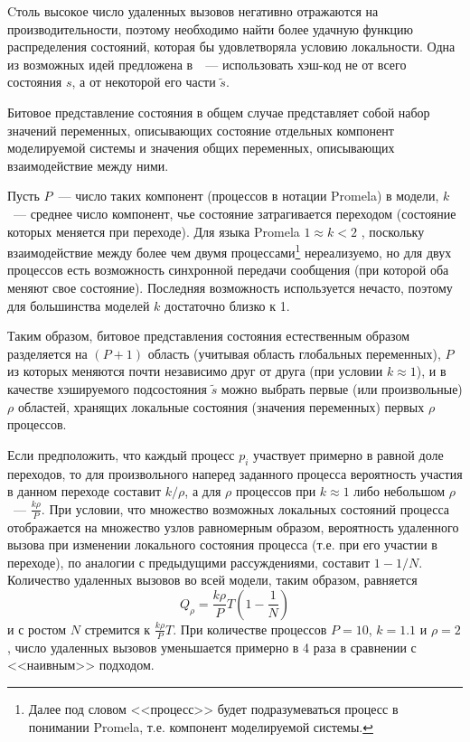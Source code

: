\documentclass[12pt,a4paper,fleqn]{article}
\begin{document}
Cтоль высокое число удаленных вызовов негативно отражаются на производительности, поэтому необходимо найти более удачную
функцию распределения состояний, которая бы удовлетворяла условию локальности. Одна из возможных идей предложена
в~\cite{LS99}~--- использовать хэш-код не от всего состояния $s$, а от некоторой его части $\tilde{s}$.

Битовое представление состояния в общем случае представляет собой набор значений переменных, описывающих состояние
отдельных компонент моделируемой системы и значения общих переменных, описывающих взаимодействие между ними.

Пусть $P$~--- число таких компонент (процессов в нотации Promela) в модели, $k$~--- среднее число компонент, чье
состояние затрагивается переходом (состояние которых меняется при переходе). Для языка Promela $1 \approx k < 2$ ,
поскольку взаимодействие между более чем двумя процессами\footnote{Далее под словом <<процесс>> будет подразумеваться
  процесс в понимании Promela, т.е. компонент моделируемой системы.} нереализуемо, но для двух процессов есть
возможность синхронной передачи сообщения (при которой оба меняют свое состояние). Последняя возможность используется
нечасто, поэтому для большинства моделей $k$ достаточно близко к 1.

Таким образом, битовое представления состояния естественным образом разделяется на $(P+1)$ область (учитывая область
глобальных переменных), $P$ из которых меняются почти независимо друг от друга (при условии $k \approx 1$), и в качестве
хэшируемого подсостояния $\tilde{s}$ можно выбрать первые (или произвольные) $\rho$ областей, хранящих локальные
состояния (значения переменных) первых $\rho$ процессов.

Если предположить, что каждый процесс $p_i$ участвует примерно в равной доле переходов, то для произвольного наперед
заданного процесса вероятность участия в данном переходе составит $k/\rho$, а для $\rho$ процессов при $k \approx 1$
либо небольшом $\rho$~--- $\frac{k \rho}{P}$. При условии, что множество возможных локальных состояний процесса
отображается на множество узлов равномерным образом, вероятность удаленного вызова при изменении локального состояния
процесса (т.е. при его участии в переходе), по аналогии с предыдущими рассуждениями, составит $1 - 1/N$. Количество
удаленных вызовов во всей модели, таким образом, равняется
\begin{equation}
  \label{eq:rpc-partproc}
  Q_\rho = \frac{k \rho}{P} T (1 - \frac{1}{N}) 
\end{equation}
и с ростом $N$ стремится к $\frac{k \rho}{P} T$. При количестве процессов $P = 10$, $k = 1.1$ и $\rho = 2$, число
удаленных вызовов уменьшается примерно в 4 раза в сравнении с <<наивным>> подходом.
\end{document}

